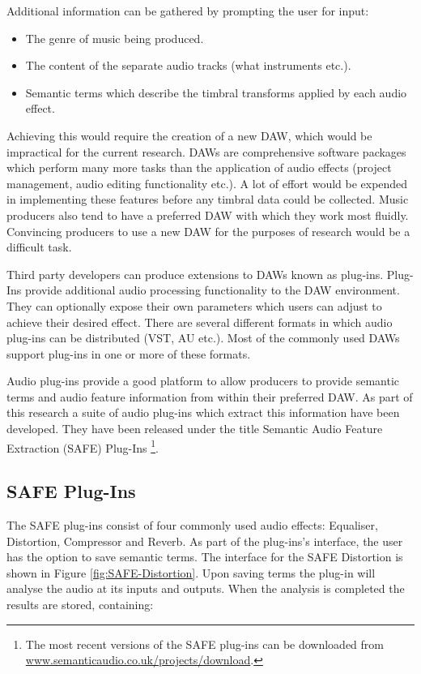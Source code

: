 		Additional information can be gathered by prompting the user for input:

		\begin{itemize}
			\item The genre of music being produced.
			\item The content of the separate audio tracks (what instruments etc.).
			\item Semantic terms which describe the timbral transforms applied by each audio
			      effect.
		\end{itemize}

		Achieving this would require the creation of a new DAW, which would be impractical for the current
		research.  DAWs are comprehensive software packages which perform many more tasks than the application of
		audio effects (project management, audio editing functionality etc.). A lot of effort would be expended in
		implementing these features before any timbral data could be collected. Music producers also tend to have a
		preferred DAW with which they work most fluidly. Convincing producers to use a new DAW for the purposes of
		research would be a difficult task.

		Third party developers can produce extensions to DAWs known as plug-ins. Plug-Ins provide additional audio
		processing functionality to the DAW environment. They can optionally expose their own parameters which
		users can adjust to achieve their desired effect. There are several different formats in which audio
		plug-ins can be distributed (VST, AU etc.). Most of the commonly used DAWs support plug-ins in one or more
		of these formats.

		Audio plug-ins provide a good platform to allow producers to provide semantic terms and audio feature
		information from within their preferred DAW. As part of this research a suite of audio plug-ins which
		extract this information have been developed. They have been released under the title Semantic Audio
		Feature Extraction (SAFE) Plug-Ins \footnote{The most recent versions of the SAFE plug-ins can be
		downloaded from \href{http://www.semanticaudio.co.uk/projects/download/}
		{www.semanticaudio.co.uk/projects/download}.}.

	\subsection{SAFE Plug-Ins}
	\label{sec:TimbreEvaluation-DAWBasedTimbreEvaluation-SAFE}
		The SAFE plug-ins consist of four commonly used audio effects: Equaliser, Distortion, Compressor and
		Reverb. As part of the plug-ins's interface, the user has the option to save semantic terms. The interface
		for the SAFE Distortion is shown in Figure \ref{fig:SAFE-Distortion}. Upon saving terms the plug-in will
		analyse the audio at its inputs and outputs. When the analysis is completed the results are stored,
		containing:

